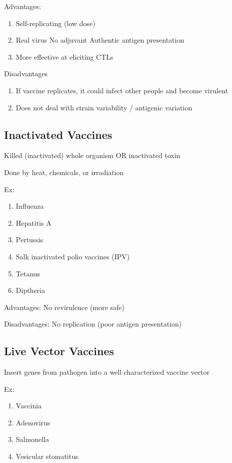 \documentclass{notes}
\begin{document}
Advantages:
\begin{enumerate}
    \item Self-replicating (low dose)
    \item Real virus
    \subitem No adjuvant
    \subitem Authentic antigen presentation
    \item More effective at eliciting CTLs
\end{enumerate}

Disadvantages
\begin{enumerate}
    \item If vaccine replicates, it could infect other people and become virulent
    \item Does not deal with strain variability / antigenic variation
\end{enumerate}

\subsection*{Inactivated Vaccines}
Killed (inactivated) whole organism OR inactivated toxin

\tab \indicates Done by heat, chemicals, or irradiation

Ex:
\begin{enumerate}
    \item Influenza
    \item Hepatitis A
    \item Pertussis
    \item Salk inactivated polio vaccines (IPV)
    \item Tetanus
    \item Diptheria
\end{enumerate}

Advantages: No revirulence (more safe)

Disadvantages: No replication (poor antigen presentation)

\subsection*{Live Vector Vaccines}
Insert genes from pathogen into a well characterized vaccine vector

Ex: 
\begin{enumerate}
    \item Vaccinia
    \item Adenovirus
    \item Salmonella
    \item Vesicular stomatitus
\end{enumerate}
\end{document}

